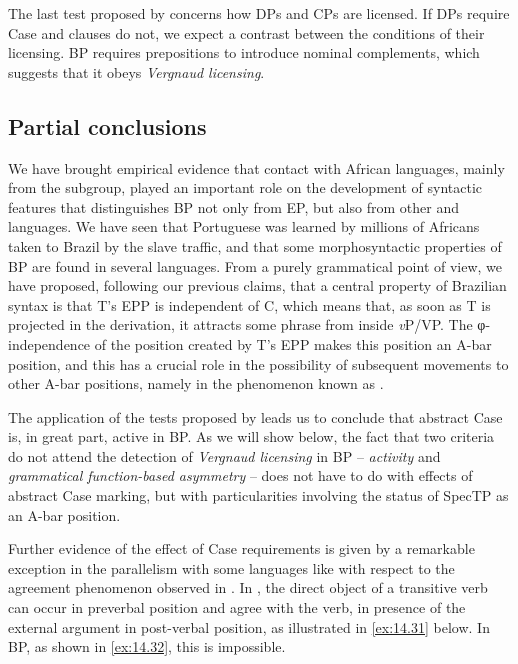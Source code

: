 \documentclass[output=paper]{langsci/langscibook}
\begin{document}
\largerpage

The last test proposed by \citeauthor{SheevanderWal2018} concerns how DPs and
CPs are licensed. If DPs require Case and clauses do not, we expect a contrast
between the conditions of their licensing. \gls{BP}
requires prepositions to introduce nominal complements, which suggests that it
obeys \emph{Vergnaud licensing}.

\subsection{Partial conclusions}\label{sec:14.4.3}\largerpage

We have brought empirical evidence that contact with African languages, mainly
from the  subgroup, played an important role on the development of
syntactic features that distinguishes \gls{BP} not
only from \gls{EP}, but also from other 
and  languages. We have seen that Portuguese was learned by
millions of Africans taken to Brazil by the slave traffic, and that some
morphosyntactic properties of \gls{BP} are found in
several  languages. From a purely grammatical point of view, we have
proposed, following our previous claims, that a central property of Brazilian
syntax is that T’s \gls{EPP} is independent
of C, which means that, as soon as T is projected in the derivation, it
attracts some phrase from inside \emph{v}P/VP. The φ-independence of the
position created by T’s \gls{EPP} makes this
position an A-bar position, and this has a crucial role in the possibility of
subsequent movements to other A-bar positions, namely in the phenomenon known
as .

The application of the tests proposed by \textcite{SheevanderWal2018} leads us
to conclude that abstract Case is, in great part, active in
\gls{BP}. As we will show below, the fact that two
criteria do not attend the detection of \emph{Vergnaud licensing} in
\gls{BP} – \emph{activity} and \emph{grammatical
function-based asymmetry} – does not have to do with effects of abstract Case
marking, but with particularities involving the status of SpecTP as an A-bar
position.

Further evidence of the effect of Case requirements is given by a remarkable
exception in the parallelism with some  languages like  with
respect to the agreement phenomenon observed in . In
, the direct object of a transitive verb can occur in preverbal
position and agree with the verb, in presence of the external argument in
post-verbal position, as illustrated in \eqref{ex:14.31} below. In \gls{BP}, as
shown in \eqref{ex:14.32}, this is impossible.
\end{document}
